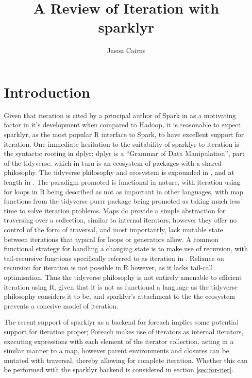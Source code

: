 \documentclass[10pt,a4paper]{article}
\begin{document}
\title{A Review of Iteration with sparklyr}
\author{Jason Cairns}
  
\maketitle{}

\section{Introduction}
Given that iteration is cited by a principal author of Spark in
\citeauthor{zaharia2010spark} as a motivating factor in it's development when
compared to Hadoop, it is reasonable to expect sparklyr, as the most popular R
interface to Spark, to have excellent support for iteration.
One immediate hesitation to the suitability of sparklyr to iteration is the
syntactic rooting in dplyr; dplyr is a ``Grammar of Data Manipulation'', part
of the tidyverse, which in turn is an ecosystem of packages with a shared
philosophy. 
The tidyverse philosophy and ecosystem is expounded in
\citeauthor{wickham2019welcome}, and at length in \citeauthor{wickham2016r}. 
The paradigm promoted is functional in nature, with iteration using for loops
in R being described as not as important in other languages, with map functions
from the tidyverse purrr package being promoted as taking much less time to
solve iteration problems.
Maps do provide a simple abstraction for traversing over a collection, similar
to internal iterators, however they offer no control of the form of traversal,
and most importantly, lack mutable state between iterations that typical for
loops or generators allow.
A common functional strategy for handling a changing state is to make use of
recursion, with tail-recursive functions specifically referred to as iteration
in \citeauthor{abelson1996structure}.
Reliance on recursion for iteration is not possible in R however, as it lacks
tail-call optimisation.
Thus the tidyverse philosophy is not entirely amenable to efficient iteration
using R, given that it is not as functional a language as the tidyverse
philosophy considers it to be, and sparklyr's attachment to the the ecosystem
prevents a cohesive model of iteration.

The recent support of sparklyr as a backend for foreach implies some potential
support for iteration proper;
Foreach makes use of iterators as internal iterators, executing expressions
with each element of the iterator collection, acting in a similar manner to a
map, however parent environments and closures can be mutated with traversal,
thereby allowing for complete iteration.
Whether this can be performed with the sparklyr backend is considered in
section \ref{sec:for-iter}.
\end{document}
